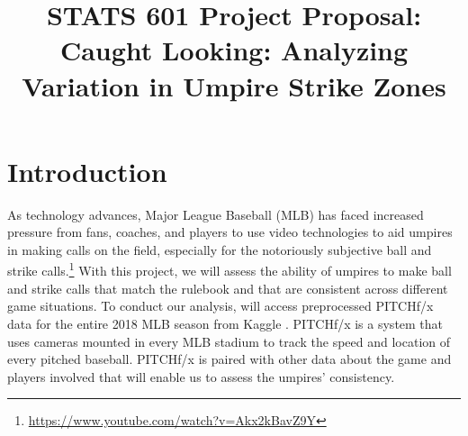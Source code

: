 \documentclass[bj, preprint]{imsart}
\begin{document}
\begin{frontmatter}

\title{{\Large STATS 601 Project Proposal:} \\ 
\bf Caught Looking: Analyzing Variation in Umpire Strike Zones}






\end{frontmatter}





\section{Introduction}\label{sec:intro}
As technology advances, Major League Baseball (MLB) has faced increased pressure from fans, coaches, and players to use video technologies to aid umpires in making calls on the field, especially for the notoriously subjective ball and strike calls.\footnote{\url{https://www.youtube.com/watch?v=Akx2kBavZ9Y}}
With this project, we will assess the ability of umpires to make ball and strike calls that match the rulebook and that are consistent across different game situations. 
To conduct our analysis, will access preprocessed PITCHf/x data for the entire 2018 MLB season from Kaggle \citep{schale2019mlb}. 
PITCHf/x is a system that uses cameras mounted in every MLB stadium to track the speed and location of every pitched baseball. 
PITCHf/x is paired with other data about the game and players involved that will enable us to assess the umpires' consistency.
\vspace{-1.5mm}
\end{document}
